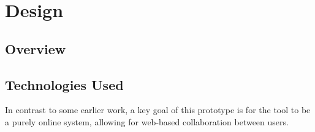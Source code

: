 %
\chapter{Design}
\label{sec:design}


\section{Overview}
\label{sec:design:overview}

\Blindtext[1][2]



\section{Technologies Used}
\label{sec:overview:technologies-used}

In contrast to some earlier work, a key goal of this prototype is for the tool to be a purely online system, allowing for web-based collaboration between users.  

%
%
%
%
%
%
%
%
%
%
%
%
%

